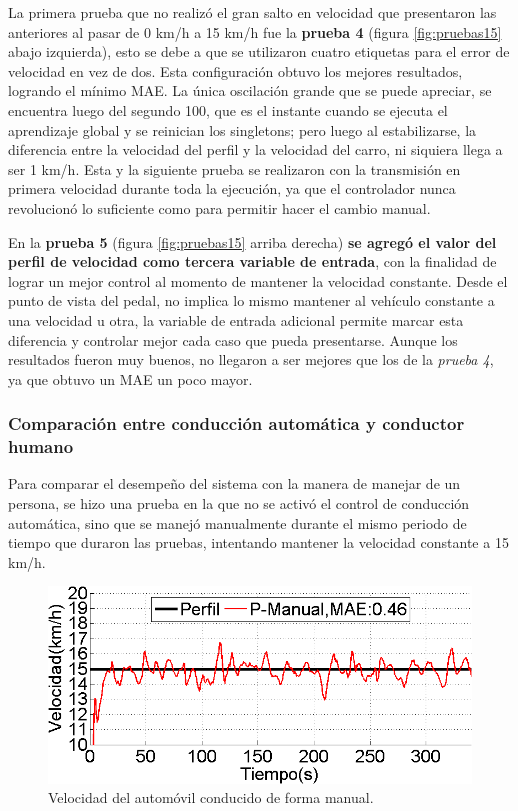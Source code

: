 La primera prueba que no realizó el gran salto en velocidad que presentaron las anteriores al pasar de 0 km/h a 15 km/h fue la \textbf{prueba 4} (figura \ref{fig:pruebas15} abajo izquierda), esto se debe a que se utilizaron cuatro etiquetas para el error de velocidad en vez de dos. Esta configuración obtuvo los mejores resultados, logrando el mínimo \gls{MAE}. La única oscilación grande que se puede apreciar, se encuentra luego del segundo 100, que es el instante cuando se ejecuta el aprendizaje global y se reinician los singletons; pero luego al estabilizarse, la diferencia entre la velocidad del perfil y la velocidad del carro, ni siquiera llega a ser 1 km/h. Esta y la siguiente prueba se realizaron con la transmisión en primera velocidad durante toda la ejecución, ya que el controlador nunca revolucionó lo suficiente como para permitir hacer el cambio manual.

En la \textbf{prueba 5} (figura \ref{fig:pruebas15} arriba derecha) \textbf{se agregó el valor del perfil de velocidad como tercera variable de entrada}, con la finalidad de lograr un mejor control al momento de mantener la velocidad constante. Desde el punto de vista del pedal, no implica lo mismo mantener al vehículo constante a una velocidad u otra, la variable de entrada adicional permite marcar esta diferencia y controlar mejor cada caso que pueda presentarse. Aunque los resultados fueron muy buenos, no llegaron a ser mejores que los de la \textit{prueba 4}, ya que obtuvo un \gls{MAE} un poco mayor.

 
\subsubsection*{Comparación entre conducción automática y conductor humano}
\label{subsec:autoManual}

Para comparar el desempeño del sistema con la manera de manejar de un persona, se hizo una prueba en la que no se activó el control de conducción automática, sino que se manejó manualmente durante el mismo periodo de tiempo que duraron las pruebas, intentando mantener la velocidad constante a 15 km/h.    

\begin{figure}[!h]
\centering
\includegraphics[width=0.6\linewidth]{figures/manual.png}
\caption{Velocidad del automóvil conducido de forma manual.}
\label{fig:manual}
\end{figure}

